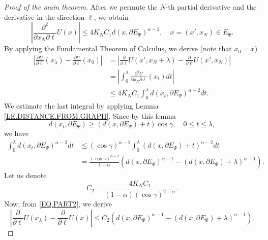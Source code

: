 \documentclass[10pt]{amsart}
\theoremstyle{definition}
\numberwithin{equation}{section}
\begin{document}
\begin{proof}[Proof of the main theorem]
After we permute the $N$-th partial  derivative and the derivative in the direction $\ell$, we obtain
\begin{equation*}
\left|\frac {\partial^2 } {\partial x_N\partial \ell}  U (x)\right| 
\le  4 K_N  C_1  d(x, \partial  E_\Psi)^{\alpha-2},\quad x=(x',x_N)\in E_\Psi.
\end{equation*}
By applying  the  Fundamental Theorem of Calculus,  we  derive   (note  that  $x_0 = x$)
\begin{equation}\label{EQ.PART2}\begin{split}
\left|\frac {\partial U} {\partial {\ell }}(x_\lambda) -\frac {\partial U} {\partial {\ell }} (x_0)\right| &
=\left|\frac {\partial} {\partial {\ell }}
U(x',x_N + \lambda) -\frac {\partial} {\partial {\ell }} U (x',x_N)\right|  
\\&=\left|\int_{0}^{\lambda}  \frac {\partial^2 U} {\partial x_N\partial \ell} (x_t) dt \right|
\\&\le  4K_N  C_1 \int_{0}^{\lambda} d(x_t,\partial E_\Psi)^{\alpha-2}dt.
\end{split}\end{equation}
We  estimate  the last integral by applying Lemma \ref{LE.DISTANCE.FROM.GRAPH}.  Since by this lemma
\begin{equation*}
d(x_t,\partial E_\Psi)\ge (d(x,\partial E_\Psi)  + t)\cos \gamma ,\quad 0\le t\le \lambda,
\end{equation*}
we have
\begin{equation*}\begin{split}
\int_{0}^{\lambda} d(x_t,\partial E_\Psi)^{\alpha-2}dt &
\le (\cos \gamma) ^{\alpha-2} \int_ 0 ^\lambda ( d(x,\partial E_\Psi) + t)^{\alpha-2} dt
\\& = \frac {(\cos \gamma) ^{\alpha-2}} {1-\alpha}
\left(d(x,\partial E_\Psi)^{\alpha-1}  -( d(x,\partial E_\Psi) + \lambda)^{\alpha-1}\right).
\end{split}\end{equation*}
Let us  denote
\begin{equation*}
C_2 = \frac {4 K_N  C_1}  {(1-\alpha)(\cos\gamma)^{2-\alpha}}.
\end{equation*}
Now,  from  \eqref{EQ.PART2}, we derive
\begin{equation}\label{EQ.PART2.2}
\left|\frac {\partial }{\partial {\ell }}U(x  _ \lambda)  -\frac {\partial } {\partial {\ell }}  U (x)\right|
\le  C_2\left(d(x,\partial E_\Psi)^{\alpha-1}  -  ( d(x,\partial E_\Psi) + \lambda)^{\alpha-1}\right).
\end{equation}


\end{proof}
\end{document}
